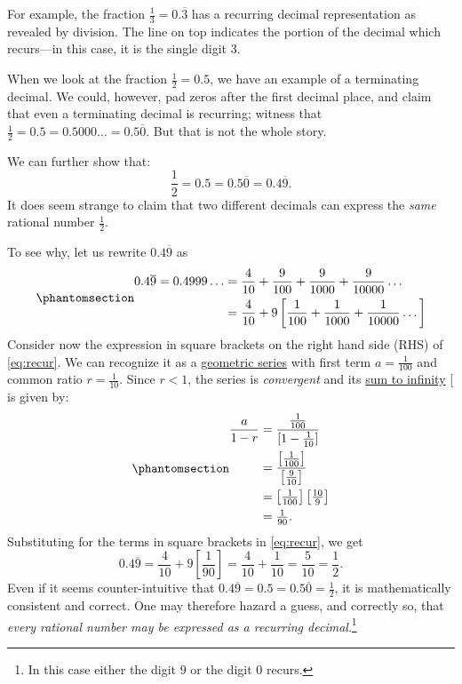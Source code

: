 \documentclass[
  a4paper,
]{article}
\begin{document}
For example, the fraction \(\frac{1}{3} = 0.\overline{3}\) has a
recurring decimal representation as revealed by division. The line on
top indicates the portion of the decimal which recurs---in this case, it
is the single digit \(3\).

When we look at the fraction \(\frac{1}{2} = 0.5\), we have an example
of a terminating decimal. We could, however, pad zeros after the first
decimal place, and claim that even a terminating decimal is recurring;
witness that \(\frac{1}{2} = 0.5 = 0.5000 \dots = 0.5\overline{0}\). But
that is not the whole story.

We can further show that: \[
\frac{1}{2} = 0.5 = 0.5\overline{0} = 0.4\overline{9}.
\] It does seem strange to claim that two different decimals can express
the \emph{same} rational number \(\frac{1}{2}\).

To see why, let us rewrite \(0.4\overline{9}\) as
\begin{equation}\phantomsection\label{eq:recur}{
\begin{aligned}
0.4\overline{9} = 0.4999\dots &= \frac{4}{10} + \frac{9}{100} + \frac{9}{1000} + \frac{9}{10000}\dots\\
&= \frac{4}{10} + 9\left[ \frac{1}{100} + \frac{1}{1000} + \frac{1}{10000} \dots\right]\\
\end{aligned}
}\end{equation} Consider now the expression in square brackets on the
right hand side (RHS) of \cref{eq:recur}. We can recognize it as a
\href{https://mathworld.wolfram.com/GeometricSeries.html}{geometric
series} with first term \(a = \frac{1}{100}\) and common ratio
\(r = \frac{1}{10}\). Since \(r < 1\), the series is \emph{convergent}
and its
\href{https://senecalearning.com/en-GB/revision-notes/a-level/maths/edexcel/pure-maths/4-2-9-sum-to-infinity-of-a-geometric-series}{sum
to infinity} {[}\citeproc{ref-seneca}{1}{]} is given by:
\begin{equation}\phantomsection\label{eq:sum}{
\begin{aligned}
\frac{a}{1 - r} &= \frac{\frac{1}{100}}{[1 - \frac{1}{10}]}\\
&= \frac{\left[\frac{1}{100}\right]}{\left[\frac{9}{10}\right]}\\
&= \left[\tfrac{1}{100}\right] \left[\tfrac{10}{9}\right]\\
& = \tfrac{1}{90}.
\end{aligned}
}\end{equation} Substituting for the terms in square brackets in
\cref{eq:recur}, we get \[
0.4\overline{9} = \frac{4}{10} + 9\left[\frac{1}{90}\right] = \frac{4}{10} + \frac{1}{10} = \frac{5}{10} = \frac{1}{2}.
\] Even if it seems counter-intuitive that
\(0.4\overline{9} = 0.5 = 0.5\overline{0} = \frac{1}{2}\), it is
mathematically consistent and correct. One may therefore hazard a guess,
and correctly so, that \emph{every rational number may be expressed as a
recurring decimal}.\footnote{In this case either the digit \(9\) or the
  digit \(0\) recurs.}
\end{document}
